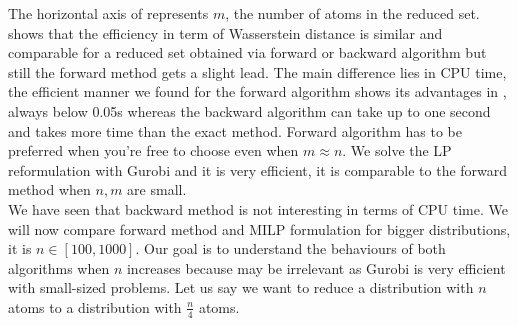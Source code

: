 \documentclass{amsart}
\begin{document}
The horizontal axis of  represents $m$, the number of atoms in the reduced set.  shows that the efficiency in term of Wasserstein distance is similar and comparable for a reduced set obtained via forward or backward algorithm but still the forward method gets a slight lead. The main difference lies in CPU time, the efficient manner we found for the forward algorithm shows its advantages in , always below 0.05s whereas the backward algorithm can take up to one second and takes more time than the exact method. Forward algorithm has to be preferred when you're free to choose even when $m\approx n$. We solve the LP reformulation with Gurobi and it is very efficient, it is comparable to the forward method when $n,m$ are small. \\
We have seen that backward method is not interesting in terms of CPU time. We will now compare forward method and MILP formulation for bigger distributions, it is $n\in\left[100,1000\right]$. Our goal is to understand the behaviours of both algorithms when $n$ increases because  may be irrelevant as Gurobi is very efficient with small-sized problems. Let us say we want to reduce a distribution with $n$ atoms to a distribution with $\frac{n}{4}$ atoms.
\clearpage
\end{document}
